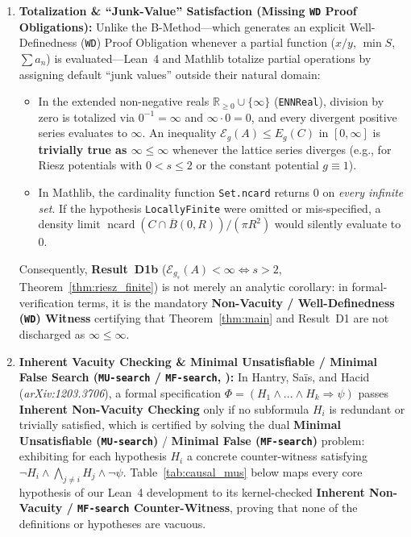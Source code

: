 \documentclass[11pt, a4paper]{article}
\theoremstyle{definition}
\theoremstyle{remark}
\newcommand{\R}{\mathbb{R}}
\newcommand{\Ecal}{\mathcal{E}}
\newcommand{\Bbar}{\overline{B}}
\begin{document}
\begin{enumerate}[leftmargin=*, label=\textbf{Failure Mode \arabic*:}]
    \item \textbf{Totalization \& ``Junk-Value'' Satisfaction (Missing \texttt{WD} Proof Obligations):}
    Unlike the B-Method---which generates an explicit Well-Definedness (\texttt{WD}) Proof Obligation whenever a partial function ($x/y$, $\min S$, $\sum a_n$) is evaluated---Lean~4 and Mathlib totalize partial operations by assigning default ``junk values'' outside their natural domain:
    \begin{itemize}[nosep]
        \item In the extended non-negative reals $\R_{\ge 0}\cup\{\infty\}$ (\texttt{ENNReal}), division by zero is totalized via $0^{-1} = \infty$ and $\infty \cdot 0 = 0$, and every divergent positive series evaluates to $\infty$. An inequality $\Ecal_g(A) \le E_g(C)$ in $[0,\infty]$ is \textbf{trivially true as $\infty \le \infty$} whenever the lattice series diverges (e.g., for Riesz potentials with $0 < s \le 2$ or the constant potential $g \equiv 1$).
        \item In Mathlib, the cardinality function \texttt{Set.ncard} returns $0$ on \emph{every infinite set}. If the hypothesis \texttt{LocallyFinite} were omitted or mis-specified, a density limit $\operatorname{ncard}(C \cap \Bbar(0,R))/(\pi R^2)$ would silently evaluate to $0$.
    \end{itemize}
    Consequently, \textbf{Result~D1b} ($\Ecal_{g_s}(A) < \infty \iff s > 2$, Theorem~\ref{thm:riesz_finite}) is not merely an analytic corollary: in formal-verification terms, it is the mandatory \textbf{Non-Vacuity / Well-Definedness (\texttt{WD}) Witness} certifying that Theorem~\ref{thm:main} and Result~D1 are not discharged as $\infty \le \infty$.

    \item \textbf{Inherent Vacuity Checking \& Minimal Unsatisfiable / Minimal False Search (\texttt{MU-search} / \texttt{MF-search}, \cite{HHS12}):}
    In Hantry, Sa\"is, and Hacid~\cite{HHS12} (\emph{arXiv:1203.3706}), a formal specification $\Phi = (H_1 \wedge \dots \wedge H_k \Rightarrow \psi)$ passes \textbf{Inherent Non-Vacuity Checking} only if no subformula $H_i$ is redundant or trivially satisfied, which is certified by solving the dual \textbf{Minimal Unsatisfiable (\texttt{MU-search})} / \textbf{Minimal False (\texttt{MF-search})} problem: exhibiting for each hypothesis $H_i$ a concrete counter-witness satisfying $\neg H_i \wedge \bigwedge_{j \neq i} H_j \wedge \neg \psi$. Table~\ref{tab:causal_mus} below maps every core hypothesis of our Lean~4 development to its kernel-checked \textbf{Inherent Non-Vacuity / \texttt{MF-search} Counter-Witness}, proving that none of the definitions or hypotheses are vacuous.


\end{enumerate}
\end{document}
